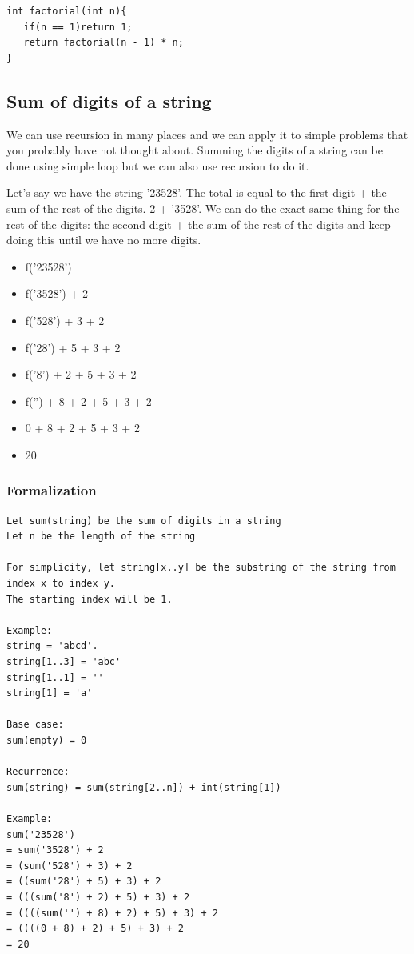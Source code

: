 \documentclass[11pt,oneside]{book}
\begin{document}
\begin{lstlisting}
int factorial(int n){
   if(n == 1)return 1;
   return factorial(n - 1) * n;
}
\end{lstlisting}

\subsection{Sum of digits of a string}

We can use recursion in many places and we can apply it to simple problems that you probably have not thought about. Summing the digits of a string can be done using simple loop but we can also use recursion to do it.

Let's say we have the string '23528'. The total is equal to the first digit + the sum of the rest of the digits. 2 + '3528'. We can do the exact same thing for the rest of the digits: the second digit + the sum of the rest of the digits and keep doing this until we have no more digits.

\begin{itemize}
\item f('23528')
\item f('3528') + 2
\item f('528') + 3 + 2
\item f('28') + 5 + 3 + 2
\item f('8') + 2 + 5 + 3 + 2
\item f('') + 8 + 2 + 5 + 3 + 2
\item 0 + 8 + 2 + 5 + 3 + 2
\item 20
\end{itemize}

\subsubsection{Formalization}

\begin{lstlisting}
Let sum(string) be the sum of digits in a string
Let n be the length of the string

For simplicity, let string[x..y] be the substring of the string from index x to index y. 
The starting index will be 1.

Example: 
string = 'abcd'.
string[1..3] = 'abc'
string[1..1] = ''
string[1] = 'a'

Base case:
sum(empty) = 0

Recurrence:
sum(string) = sum(string[2..n]) + int(string[1])

Example:
sum('23528')
= sum('3528') + 2
= (sum('528') + 3) + 2
= ((sum('28') + 5) + 3) + 2
= (((sum('8') + 2) + 5) + 3) + 2
= ((((sum('') + 8) + 2) + 5) + 3) + 2
= ((((0 + 8) + 2) + 5) + 3) + 2
= 20
\end{lstlisting}
\end{document}
